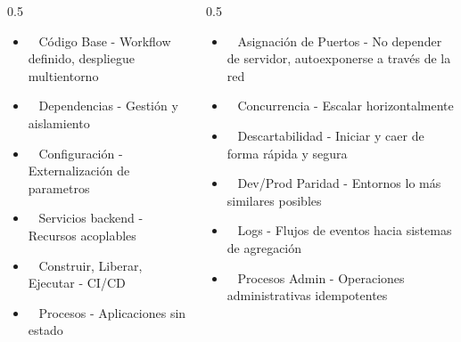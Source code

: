 \documentclass[aspectratio=169]{beamer}
\begin{document}
\begin{frame}
	
	\begin{columns}
		
		\begin{column}{0.5\textwidth}
			\begin{itemize}
				\item \faCode ~ Código Base - Workflow definido, despliegue multientorno
				\item \faBox ~ Dependencias - Gestión y aislamiento
				\item \faCogs ~ Configuración - Externalización de parametros
				\item \faDatabase ~ Servicios backend  - Recursos acoplables
				\item \faCube ~ Construir, Liberar, Ejecutar - CI/CD 
				\item \faPlayCircle ~ Procesos - Aplicaciones sin estado
			\end{itemize}
		\end{column}
		
				
		\begin{column}{0.5\textwidth}
			\begin{itemize}
				\item \faShip ~ Asignación de Puertos - No depender de servidor, autoexponerse a través de la red
				\item \faTasks ~ Concurrencia - Escalar horizontalmente
				\item \faCloud ~ Descartabilidad - Iniciar y caer de forma rápida y segura
				\item \faEquals ~ Dev/Prod Paridad - Entornos lo más similares posibles
				\item \faTerminal ~ Logs - Flujos de eventos hacia sistemas de agregación
				\item \faMedal ~ Procesos Admin - Operaciones administrativas idempotentes
			\end{itemize}
		\end{column}

	\end{columns}
\end{frame}
\end{document}
